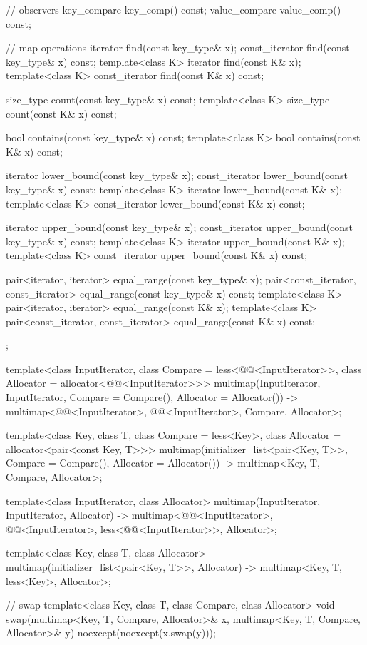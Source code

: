 \begin{codeblock}
{{    // observers
    key_compare key_comp() const;
    value_compare value_comp() const;

    // map operations
    iterator       find(const key_type& x);
    const_iterator find(const key_type& x) const;
    template<class K> iterator       find(const K& x);
    template<class K> const_iterator find(const K& x) const;

    size_type      count(const key_type& x) const;
    template<class K> size_type count(const K& x) const;

    bool           contains(const key_type& x) const;
    template<class K> bool contains(const K& x) const;

    iterator       lower_bound(const key_type& x);
    const_iterator lower_bound(const key_type& x) const;
    template<class K> iterator       lower_bound(const K& x);
    template<class K> const_iterator lower_bound(const K& x) const;

    iterator       upper_bound(const key_type& x);
    const_iterator upper_bound(const key_type& x) const;
    template<class K> iterator       upper_bound(const K& x);
    template<class K> const_iterator upper_bound(const K& x) const;

    pair<iterator, iterator>               equal_range(const key_type& x);
    pair<const_iterator, const_iterator>   equal_range(const key_type& x) const;
    template<class K>
      pair<iterator, iterator>             equal_range(const K& x);
    template<class K>
      pair<const_iterator, const_iterator> equal_range(const K& x) const;
  };

  template<class InputIterator, class Compare = less<@@<InputIterator>>,
           class Allocator = allocator<@@<InputIterator>>>
    multimap(InputIterator, InputIterator, Compare = Compare(), Allocator = Allocator())
      -> multimap<@@<InputIterator>, @@<InputIterator>,
                  Compare, Allocator>;

  template<class Key, class T, class Compare = less<Key>,
           class Allocator = allocator<pair<const Key, T>>>
    multimap(initializer_list<pair<Key, T>>, Compare = Compare(), Allocator = Allocator())
      -> multimap<Key, T, Compare, Allocator>;

  template<class InputIterator, class Allocator>
    multimap(InputIterator, InputIterator, Allocator)
      -> multimap<@@<InputIterator>, @@<InputIterator>,
                  less<@@<InputIterator>>, Allocator>;

  template<class Key, class T, class Allocator>
    multimap(initializer_list<pair<Key, T>>, Allocator)
      -> multimap<Key, T, less<Key>, Allocator>;

  // swap
  template<class Key, class T, class Compare, class Allocator>
    void swap(multimap<Key, T, Compare, Allocator>& x,
              multimap<Key, T, Compare, Allocator>& y)
      noexcept(noexcept(x.swap(y)));
}
\end{codeblock}%
